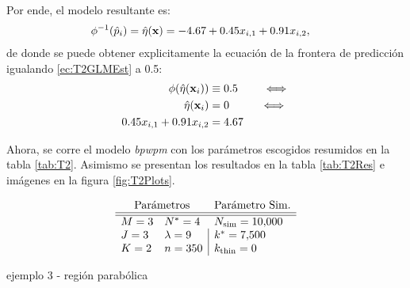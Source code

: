 \documentclass[../Main/Main.tex]{subfiles}
\begin{document}
Por ende, el modelo resultante es:
\begin{align}
 \phi^{-1}(\hat{p}_i) &= \hat{\eta}(\mathbf{x}) = -4.67 + 0.45x_{i,1} + 0.91x_{i,2}, \label{ec:T2GLMEst}
\end{align}
de donde se puede obtener explicitamente la ecuación de la frontera de predicción igualando \eqref{ec:T2GLMEst} a 0.5:
\begin{align}
	\phi(\hat{\eta}(\mathbf{x}_i)) &\equiv 0.5 \qquad \iff \nonumber \\
	\hat{\eta}(\mathbf{x}_i) &= 0 \;\;\qquad \iff  \nonumber \\
	0.45x_{i,1} + 0.91x_{i,2} &= 4.67  \label{ec:T2RectaGLM}
\end{align}

Ahora, se corre el modelo \textit{bpwpm} con los parámetros escogidos resumidos en la tabla \ref{tab:T2}. Asimismo se presentan los resultados en la tabla \ref{tab:T2Res} e imágenes en la figura \ref{fig:T2Plots}.
\begin{table}[h]
$$\paramsmod{3}{3}{2}{4}{9}{350}{\num{10000}}{\num{7500}}{0}$$
\caption{ejemplo 3 - región parabólica}
\label{tab:T2}
\end{table}
\end{document}
